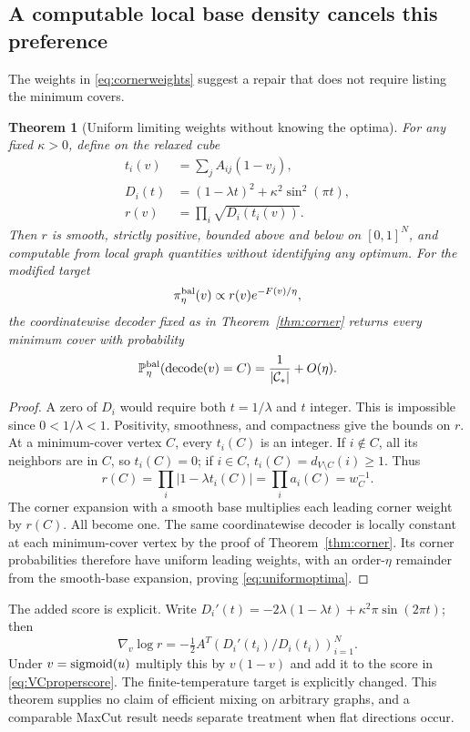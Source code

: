 \documentclass[11pt]{article}
\newtheorem{theorem}{Theorem}[section]
\theoremstyle{definition}\newtheorem{definition}[theorem]{Definition}
\theoremstyle{remark}\newtheorem{remark}[theorem]{Remark}
\numberwithin{equation}{section}
\newcommand{\1}{\mathbf 1}
\begin{document}
\subsection{A computable local base density cancels this preference}
The weights in \eqref{eq:cornerweights} suggest a repair that does not require listing the minimum covers.
\begin{theorem}[Uniform limiting weights without knowing the optima]\label{thm:balancedgraph}
For any fixed $\kappa>0$, define on the relaxed cube
\begin{align}
t_i(v)&=\sum_jA_{ij}(1-v_j),\\
D_i(t)&=(1-\lambda t)^2+\kappa^2\sin^2(\pi t),\\
r(v)&=\prod_i\sqrt{D_i(t_i(v))}.\label{eq:localbase}
\end{align}
Then $r$ is smooth, strictly positive, bounded above and below on $[0,1]^N$, and computable from local graph quantities without identifying any optimum. For the modified target
\begin{equation}
\pi^{\rm bal}_\eta(v)\propto r(v)e^{-F(v)/\eta},\label{eq:balancedtarget}
\end{equation}
the coordinatewise decoder fixed as in Theorem~\ref{thm:corner} returns every minimum cover with probability
\begin{equation}
\mathbb P^{\rm bal}_\eta(\operatorname{decode}(v)=C)
=\frac1{|\mathcal C_*|}+O(\eta).\label{eq:uniformoptima}
\end{equation}
\end{theorem}
\begin{proof}
A zero of $D_i$ would require both $t=1/\lambda$ and $t$ integer. This is impossible since $0<1/\lambda<1$. Positivity, smoothness, and compactness give the bounds on $r$. At a minimum-cover vertex $C$, every $t_i(C)$ is an integer. If $i\notin C$, all its neighbors are in $C$, so $t_i(C)=0$; if $i\in C$, $t_i(C)=d_{V\setminus C}(i)\ge1$. Thus
\[
r(C)=\prod_i|1-\lambda t_i(C)|=\prod_i a_i(C)=w_C^{-1}.
\]
The corner expansion with a smooth base multiplies each leading corner weight by $r(C)$. All become one. The same coordinatewise decoder is locally constant at each minimum-cover vertex by the proof of Theorem~\ref{thm:corner}. Its corner probabilities therefore have uniform leading weights, with an order-$\eta$ remainder from the smooth-base expansion, proving \eqref{eq:uniformoptima}.
\end{proof}
The added score is explicit. Write
$D_i'(t)=-2\lambda(1-\lambda t)+\kappa^2\pi\sin(2\pi t)$; then
\begin{equation}
\nabla_v\log r=-\tfrac12 A^T\left(D_i'(t_i)/D_i(t_i)\right)_{i=1}^N.\label{eq:basescore}
\end{equation}
Under $v=\operatorname{sigmoid}(u)$ multiply this by $v(1-v)$ and add it to the score in \eqref{eq:VCproperscore}. The finite-temperature target is explicitly changed. This theorem supplies no claim of efficient mixing on arbitrary graphs, and a comparable MaxCut result needs separate treatment when flat directions occur.
\end{document}
